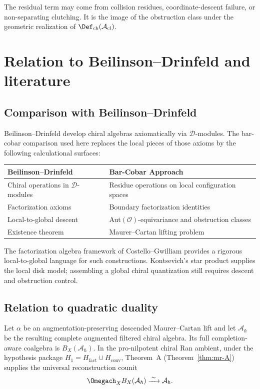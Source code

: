 The residual term may come from collision residues, coordinate-descent
failure, or non-separating clutching. It is the image of the obstruction
class under the geometric realization of
\(\Def_{\mathrm{ch}}(\mathcal A_{\mathrm{cl}})\).

\section{Relation to Beilinson--Drinfeld and literature}

\subsection{Comparison with Beilinson--Drinfeld}

Beilinson--Drinfeld \cite{BD04} develop chiral algebras axiomatically
via $\mathcal{D}$-modules. The bar-cobar comparison used here replaces
the local pieces of those axioms by the following calculational
surfaces:

\begin{center}
\begin{tabular}{|l|l|}
\hline
\textbf{Beilinson--Drinfeld} & \textbf{Bar-Cobar Approach} \\
\hline
Chiral operations in $\mathcal D$-modules & Residue operations on local configuration spaces \\
Factorization axioms & Boundary factorization identities \\
Local-to-global descent & Aut$(\mathcal O)$-equivariance and obstruction classes \\
Existence theorem & Maurer--Cartan lifting problem \\
\hline
\end{tabular}
\end{center}

The factorization algebra framework of Costello--Gwilliam provides a
rigorous local-to-global language for such constructions. Kontsevich's
star product supplies the local disk model; assembling a global chiral
quantization still requires descent and obstruction control.

\subsection{Relation to quadratic duality}

Let \(\alpha\) be an augmentation-preserving descended
Maurer--Cartan lift and let
\(\mathcal A_\hbar\) be the resulting complete augmented filtered
chiral algebra.  Its full completion-aware coalgebra is
\(B_X(\mathcal A_\hbar)\).  In the pro-nilpotent chiral Ran ambient,
under the hypothesis package
\(H_1=H_{\mathrm{fact}}\cup H_{\mathrm{conv}}\),
Theorem~A \textup{(}Theorem~\ref{thm:mr-A}\textup{)} supplies the
universal reconstruction counit
\[
 \Omegach_X B_X(\mathcal A_\hbar)
 \xrightarrow{\;\sim\;}\mathcal A_\hbar.
\]

